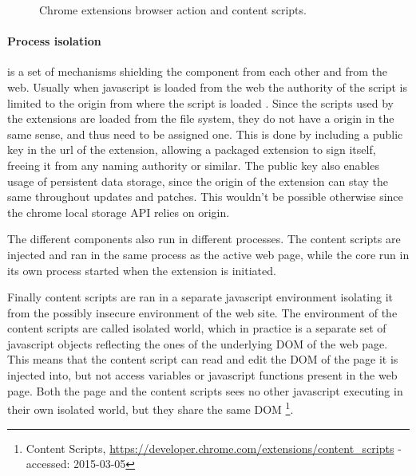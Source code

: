 \begin{figure}[h]
    \caption{Chrome extensions browser action and content scripts.}
    \label{extension-ux}
\end{figure}

\paragraph{Process isolation} is a set of mechanisms shielding the component from each other and from the web. Usually when javascript is loaded from the web the authority of the script is limited to the origin from where the script is loaded \cite{protecting-browsers}. Since the scripts used by the extensions are loaded from the file system, they do not have a origin in the same sense, and thus need to be assigned one. This is done by including a public key in the url of the extension, allowing a packaged extension to sign itself, freeing it from any naming authority or similar. The public key also enables usage of persistent data storage, since the origin of the extension can stay the same throughout updates and patches. This wouldn't be possible otherwise since the chrome local storage API relies on origin. 
\par The different components also run in different processes. The content scripts are injected and ran in the same process as the active web page, while the core run in its own process started when the extension is initiated. 
\par Finally content scripts are ran in a separate javascript environment isolating it from the possibly insecure environment of the web site. The environment of the content scripts are called isolated world, which in practice is a separate set of javascript objects reflecting the ones of the underlying DOM of the web page. This means that the content script can read and edit the DOM of the page it is injected into, but not access variables or javascript functions present in the web page. Both the page and the content scripts sees no other javascript executing in their own isolated world, but they share the same DOM \footnote{Content Scripts, \url{https://developer.chrome.com/extensions/content_scripts} - accessed: 2015-03-05}.


